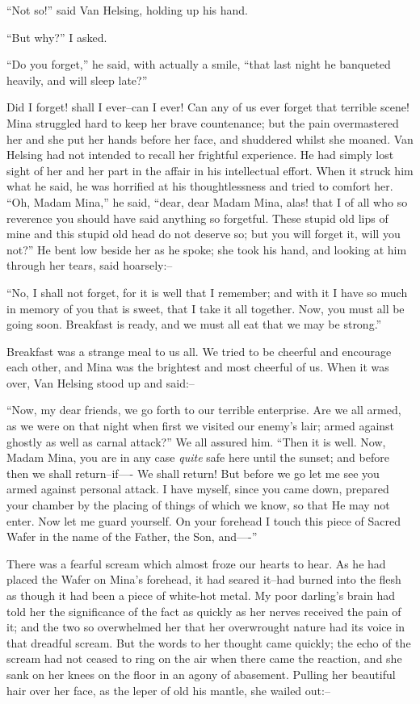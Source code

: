 \documentclass[12pt,openright]{book}
\begin{document}
“Not so!” said Van Helsing, holding up his hand.

“But why?” I asked.

“Do you forget,” he said, with actually a smile, “that last night he banqueted heavily, and will sleep late?”

Did I forget! shall I ever–can I ever! Can any of us ever forget that terrible scene! Mina struggled hard to keep her brave countenance; but the pain overmastered her and she put her hands before her face, and shuddered whilst she moaned. Van Helsing had not intended to recall her frightful experience. He had simply lost sight of her and her part in the affair in his intellectual effort. When it struck him what he said, he was horrified at his thoughtlessness and tried to comfort her. “Oh, Madam Mina,” he said, “dear, dear Madam Mina, alas! that I of all who so reverence you should have said anything so forgetful. These stupid old lips of mine and this stupid old head do not deserve so; but you will forget it, will you not?” He bent low beside her as he spoke; she took his hand, and looking at him through her tears, said hoarsely:–

“No, I shall not forget, for it is well that I remember; and with it I have so much in memory of you that is sweet, that I take it all together. Now, you must all be going soon. Breakfast is ready, and we must all eat that we may be strong.”

Breakfast was a strange meal to us all. We tried to be cheerful and encourage each other, and Mina was the brightest and most cheerful of us. When it was over, Van Helsing stood up and said:–

“Now, my dear friends, we go forth to our terrible enterprise. Are we all armed, as we were on that night when first we visited our enemy’s lair; armed against ghostly as well as carnal attack?” We all assured him. “Then it is well. Now, Madam Mina, you are in any case \textit{quite} safe here until the sunset; and before then we shall return–if—- We shall return! But before we go let me see you armed against personal attack. I have myself, since you came down, prepared your chamber by the placing of things of which we know, so that He may not enter. Now let me guard yourself. On your forehead I touch this piece of Sacred Wafer in the name of the Father, the Son, and—-”

There was a fearful scream which almost froze our hearts to hear. As he had placed the Wafer on Mina’s forehead, it had seared it–had burned into the flesh as though it had been a piece of white-hot metal. My poor darling’s brain had told her the significance of the fact as quickly as her nerves received the pain of it; and the two so overwhelmed her that her overwrought nature had its voice in that dreadful scream. But the words to her thought came quickly; the echo of the scream had not ceased to ring on the air when there came the reaction, and she sank on her knees on the floor in an agony of abasement. Pulling her beautiful hair over her face, as the leper of old his mantle, she wailed out:–
\end{document}
